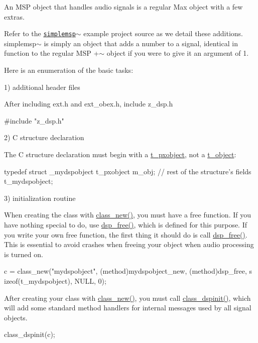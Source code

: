 An MSP object that handles audio signals is a regular Max object with a few extras.

Refer to the \href{simplemsp~_8c-source.html}{\tt simplemsp$\sim$} example project source as we detail these additions. simplemsp$\sim$ is simply an object that adds a number to a signal, identical in function to the regular MSP +$\sim$ object if you were to give it an argument of 1.

Here is an enumeration of the basic tasks:

1) additional header files

After including ext.h and ext\_\-obex.h, include z\_\-dsp.h 
\begin{DoxyCode}
    #include "z_dsp.h"
\end{DoxyCode}


2) C structure declaration

The C structure declaration must begin with a \hyperlink{structt__pxobject}{t\_\-pxobject}, not a \hyperlink{structt__object}{t\_\-object}: 
\begin{DoxyCode}
    typedef struct _mydspobject
    {
        t_pxobject m_obj;
        // rest of the structure's fields
    } t_mydspobject;
\end{DoxyCode}


3) initialization routine

When creating the class with \hyperlink{group__class_ga238696d466081965c2b72b3880358404}{class\_\-new()}, you must have a free function. If you have nothing special to do, use \hyperlink{group__msp_ga9a981adf6eea7e55d11c1a0b02592a6e}{dsp\_\-free()}, which is defined for this purpose. If you write your own free function, the first thing it should do is call \hyperlink{group__msp_ga9a981adf6eea7e55d11c1a0b02592a6e}{dsp\_\-free()}. This is essential to avoid crashes when freeing your object when audio processing is turned on. 
\begin{DoxyCode}
        c = class_new("mydspobject", (method)mydspobject_new, (method)dsp_free, s
      izeof(t_mydspobject), NULL, 0);
\end{DoxyCode}


After creating your class with \hyperlink{group__class_ga238696d466081965c2b72b3880358404}{class\_\-new()}, you must call \hyperlink{group__msp_ga7427ae73a2ad71a1b4ef1bee2fd432fc}{class\_\-dspinit()}, which will add some standard method handlers for internal messages used by all signal objects. 
\begin{DoxyCode}
        class_dspinit(c);
\end{DoxyCode}


